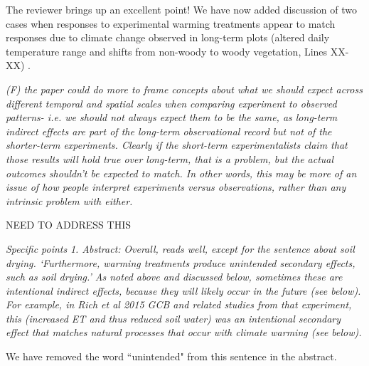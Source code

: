 \documentclass[11pt,a4paper]{letter}
\begin{document}
\begin{letter}{}
The reviewer brings up an excellent point! We have now added discussion of two cases when responses to experimental warming treatments appear to match responses due to climate change observed in long-term plots (altered daily temperature range and shifts from non-woody to woody vegetation, Lines XX-XX) . 

\emph{(F) the paper could do more to frame concepts about what we should expect across different temporal and spatial scales when comparing experiment to observed patterns- i.e. we should not always expect them to be the same, as long-term indirect effects are part of the long-term observational record but not of the shorter-term experiments. Clearly if the short-term experimentalists claim that those results will hold true over long-term, that is a problem, but the actual outcomes shouldn't be expected to match. In other words, this may be more of an issue of how people interpret experiments versus observations, rather than any intrinsic problem with either.}

NEED TO ADDRESS THIS

\emph{Specific points}
\emph{1. Abstract:}
\emph{Overall, reads well, except for the sentence about soil drying. `Furthermore, warming treatments produce unintended secondary effects, such as soil drying.' As noted above and discussed below, sometimes these are intentional indirect effects, because they will likely occur in the future (see below). For example, in Rich et al 2015 GCB and related studies from that experiment, this (increased ET and thus reduced soil water) was an intentional secondary effect that matches natural processes that occur with climate warming (see below).}

We have removed the word ``unintended"  from this sentence in the abstract.


\end{letter}
\end{document}
